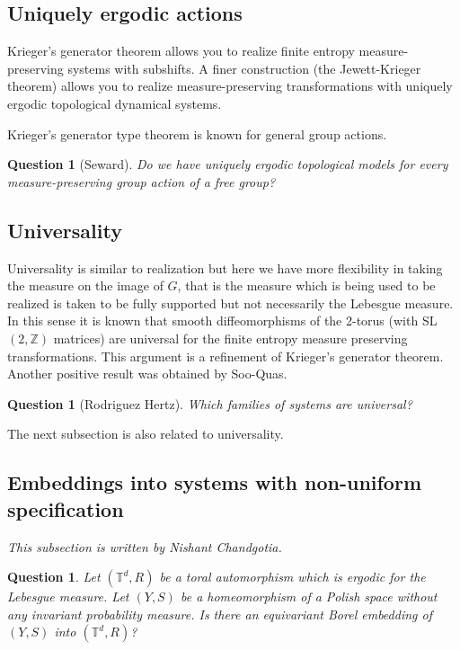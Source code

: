 \documentclass{article}
\newtheorem{question}[theorem]{Question}
\theoremstyle{definition}
\newcommand{\Z}{\mathbb{Z}}
\begin{document}
\subsection{Uniquely ergodic actions}

Krieger's generator theorem allows you to realize finite entropy measure-preserving systems with subshifts.
A finer construction (the Jewett-Krieger theorem) allows you to realize measure-preserving transformations with uniquely ergodic topological dynamical systems. 

Krieger's generator type theorem is known for general group actions. 

\begin{question}
[Seward] Do we have uniquely ergodic topological models for every measure-preserving group action of a free group?
\end{question}
\subsection{Universality}
Universality is similar to realization but here we have more flexibility in taking the measure on the image of $G$, that is the measure which is being used to be realized is taken to be fully supported but not necessarily the Lebesgue measure. In this sense it is known that smooth diffeomorphisms of the 2-torus (with SL$(2,\Z)$ matrices) are universal for the finite entropy measure preserving transformations. This argument is a refinement of Krieger's generator theorem. Another positive result was obtained by Soo-Quas. 

\begin{question}
    [Rodriguez Hertz] Which families of systems are universal? 
\end{question}

The next subsection is also related to universality. 

\subsection{Embeddings into systems with non-uniform specification}
\textit{This subsection is written by Nishant Chandgotia. }
\begin{question}\label{question: Main}\cite{chandgotia2022borel}
	Let $(\mathbb T^d, R)$ be a toral automorphism which is ergodic for the Lebesgue measure. Let $(Y, S)$ be a homeomorphism of a Polish space without any invariant probability measure. Is there an equivariant Borel embedding of $(Y, S)$ into $(\mathbb T^d, R)$?
\end{question}
\end{document}
